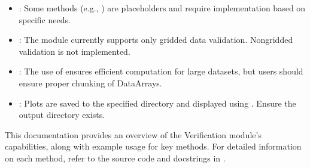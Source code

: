 \documentclass[letterpaper,10pt,english]{sphinxmanual}
\begin{document}
\begin{sphinxVerbatim}[commandchars=\\\{\}]
   

        
\end{sphinxVerbatim}
\begin{itemize}
\item {} 
\sphinxAtStartPar
{}: Some methods (e.g., ) are placeholders and require implementation based on specific needs.

\item {} 
\sphinxAtStartPar
{}: The module currently supports only gridded data validation. Non\sphinxhyphen{}gridded validation is not implemented.

\item {} 
\sphinxAtStartPar
{}: The use of  ensures efficient computation for large datasets, but users should ensure proper chunking of  DataArrays.

\item {} 
\sphinxAtStartPar
{}: Plots are saved to the specified directory and displayed using . Ensure the output directory exists.

\end{itemize}

\sphinxAtStartPar
This documentation provides an overview of the Verification module’s capabilities, along with example usage for key methods. For detailed information on each method, refer to the source code and docstrings in .
\end{document}
